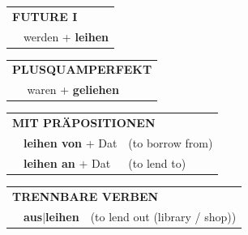 \documentclass[10pt,a4paper]{revtex4-2}
\begin{document}
\begin{verbbox-acc}
\begin{tabular}{rl}
    \multicolumn{2}{l}{\textbf{FUTURE I} }\\
   & werden + \textbf{leihen}\\
 
  \end{tabular}
\hfill
   \begin{tabular}{rl}
      \multicolumn{2}{l}{\textbf{PLUSQUAMPERFEKT}}\\
   & waren + \textbf{geliehen}\\
  \end{tabular}
  


 \vspace{10pt}

   \begin{tabular}{lll}
      \multicolumn{3}{l}{\textbf{MIT PRÄPOSITIONEN}}\\
& \textbf{leihen von} + Dat & (to borrow from)\\
& \textbf{leihen an} + Dat & (to lend to)\\
  \end{tabular}
  \hfill
   \begin{tabular}{lll}
      \multicolumn{3}{l}{\textbf{TRENNBARE VERBEN}}\\
 & \textbf{aus$|$leihen} & (to lend out (library / shop))\\
  \end{tabular}


  \vspace{-5pt}

\end{verbbox-acc}
\end{document}
